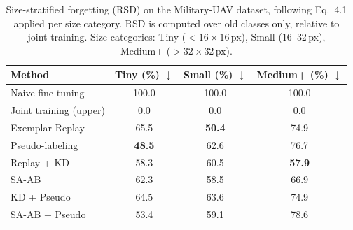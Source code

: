 \begin{table}[t]
\centering
\caption{Size-stratified forgetting (RSD) on the Military-UAV dataset,
following Eq.~4.1 applied per size category. RSD is computed over old
classes only, relative to joint training. Size categories:
Tiny ($< 16 \times 16$\,px), Small ($16$--$32$\,px),
Medium+ ($> 32 \times 32$\,px).}
\label{tab:military-size}
\begin{tabular}{l ccc}
\toprule
Method & Tiny (\%) $\downarrow$ & Small (\%) $\downarrow$ & Medium+ (\%) $\downarrow$ \\
\midrule
  Naive fine-tuning          & 100.0 & 100.0 & 100.0 \\
  Joint training (upper)     & 0.0 & 0.0 & 0.0 \\
  \midrule
  Exemplar Replay            & 65.5 & \textbf{50.4} & 74.9 \\
  Pseudo-labeling            & \textbf{48.5} & 62.6 & 76.7 \\
  Replay + KD                & 58.3 & 60.5 & \textbf{57.9} \\
  SA-AB                      & 62.3 & 58.5 & 66.9 \\
  \midrule
  KD + Pseudo                & 64.5 & 63.6 & 74.9 \\
  SA-AB + Pseudo             & 53.4 & 59.1 & 78.6 \\
\bottomrule
\end{tabular}
\end{table}
